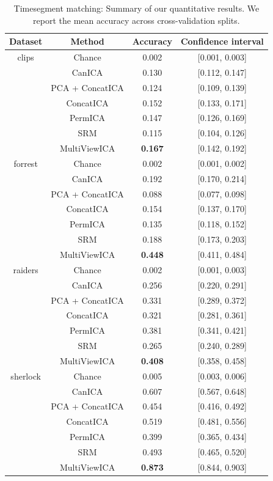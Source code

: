 \begin{table}
    \centering
    \begin{tabular}{|c|c | c | c|}
            \hline
         \textbf{Dataset} & \textbf{Method} & \textbf{Accuracy} & \textbf{Confidence interval} \\
         \hline
clips   & Chance      & 0.002&[0.001, 0.003] \\
        & CanICA    & 0.130&[0.112, 0.147] \\
        & PCA + ConcatICA      & 0.124&[0.109, 0.139] \\
        & ConcatICA    & 0.152&[0.133, 0.171] \\

        & PermICA     & 0.147&[0.126, 0.169] \\
        & SRM         & 0.115&[0.104, 0.126] \\
        & MultiViewICA& \textbf{0.167}&[0.142, 0.192] \\
        \hline
forrest & Chance      & 0.002&[0.001, 0.002] \\
        & CanICA    & 0.192&[0.170, 0.214] \\
        & PCA + ConcatICA      & 0.088&[0.077, 0.098] \\
        & ConcatICA    & 0.154&[0.137, 0.170] \\
        & PermICA     & 0.135&[0.118, 0.152] \\
        & SRM         & 0.188&[0.173, 0.203] \\
        & MultiViewICA& \textbf{0.448}&[0.411, 0.484] \\
        \hline
raiders & Chance      & 0.002&[0.001, 0.003] \\
        & CanICA    & 0.256&[0.220, 0.291] \\
        & PCA + ConcatICA      & 0.331&[0.289, 0.372] \\
        & ConcatICA    & 0.321&[0.281, 0.361] \\
        & PermICA     & 0.381&[0.341, 0.421] \\
        & SRM         & 0.265&[0.240, 0.289] \\
         & MultiViewICA& \textbf{0.408}&[0.358, 0.458] \\
         \hline
sherlock& Chance      & 0.005&[0.003, 0.006] \\
        & CanICA    & 0.607&[0.567, 0.648] \\
        & PCA + ConcatICA      & 0.454&[0.416, 0.492] \\
        & ConcatICA    & 0.519&[0.481, 0.556] \\
        & PermICA     & 0.399&[0.365, 0.434] \\
        & SRM         & 0.493&[0.465, 0.520] \\
        & MultiViewICA& \textbf{0.873}&[0.844, 0.903] \\
\hline
    \end{tabular}
    \caption{Timesegment matching: Summary of our quantitative results. We report the mean accuracy across cross-validation splits.}
    \label{tab:timeseg}
\end{table}

